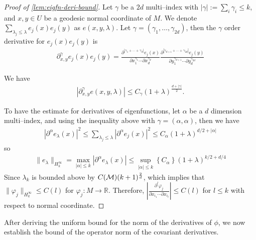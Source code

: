 \begin{proof}[Proof of \cref{lem:eigfn-deri-bound}]
Let $\gamma$ be a $2d$ multi--index with $|\gamma|:=\sum_i\gamma_i\leq k$, and $x,y \in U$ be a geodesic normal coordinate of $M$. We denote $\sum_{\lambda_j\leq \lambda} e_j(x) e_j(y)$ as $e(x,y,\lambda)$. Let $\gamma = \left(\gamma_1,\dots,\gamma_{2d}\right)$, then the $\gamma$ order derivative for $e_j(x) e_j(y)$ is 
\begin{align}
	\partial^\gamma_{x,y} e_j(x) e_j(y) = \frac{\partial^{|\gamma_1+\cdots+\gamma_{d}|}e_j(x)}{\partial x_1^{\gamma_1} \cdots \partial x_d^{\gamma_d}} \frac{\partial^{|\gamma_{d+1}+\cdots+\gamma_{2d}|}e_j(y)}{\partial y_1^{\gamma_{d+1}} \cdots \partial y_d^{\gamma_{2d}}}
\end{align}

We have \cite[Lem. 2.4]{2004Xuhigherorder}
\begin{align}
	|\partial^\gamma_{x,y}e(x,y,\lambda)|\leq C_\gamma (1+\lambda)^{\frac{d+|\gamma|}{2}}.
\end{align}

To have the estimate for derivatives of eigenfunctions, let $\alpha$ be a $d$ dimension multi--index, and using the inequality above with $\gamma = \left(\alpha , \alpha\right)$, then we have 
\begin{align}
	|\partial^\alpha e_\lambda (x)|^2\leq\sum\limits_{\lambda_j\leq \lambda} |\partial^\alpha e_j(x)|^2 \leq C_\alpha (1+\lambda)^{d/2+|\alpha|}
\end{align}
so
\begin{align}
	\label{deriinequ}
	\|e_\lambda\|_{H^\infty_k}=\max\limits_{|\alpha|\leq k}|\partial^\alpha e_\lambda(x)|\leq \sup\limits_{|\alpha|\leq k}\left\{C_\alpha\right\}(1+\lambda)^{k/2+d/4}
\end{align}
Since $\lambda_k$ is bounded above by $C(\mathcal{M}) (k+1)^{\frac{2}{d}}$, which implies that $\|\varphi_j\|_{H_k^\infty}\leq C(l)$ for $\varphi_j:M \rightarrow \mathbb{R}$. Therefore, $|\frac{\partial^l \varphi_j}{\partial x_{i_1}\cdots\partial x_{i_l}}| \leq C(l)$ for $l\leq k$ with respect to normal coordinate.
\end{proof}

After deriving the uniform bound for the norm of the derivatives of $\phi$, we now establish the bound of the operator norm of the covariant derivatives.

